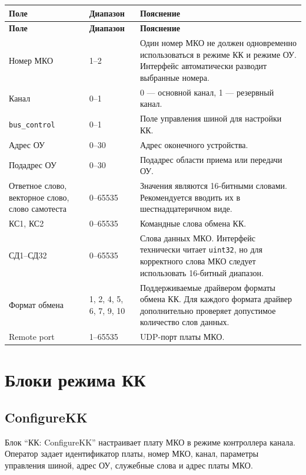 \begin{longtable}{|p{}|p{}|p{}|}
	\hline
	\textbf{Поле} & \textbf{Диапазон} & \textbf{Пояснение} \\
	\hline
	\endfirsthead
	\hline
	\textbf{Поле} & \textbf{Диапазон} & \textbf{Пояснение} \\
	\hline
	\endhead
	Номер МКО & 1--2 & Один номер МКО не должен одновременно использоваться в режиме КК и режиме ОУ. Интерфейс автоматически разводит выбранные номера. \\
	\hline
	Канал & 0--1 & 0 --- основной канал, 1 --- резервный канал. \\
	\hline
	\texttt{bus\_control} & 0--1 & Поле управления шиной для настройки КК. \\
	\hline
	Адрес ОУ & 0--30 & Адрес оконечного устройства. \\
	\hline
	Подадрес ОУ & 0--30 & Подадрес области приема или передачи ОУ. \\
	\hline
	Ответное слово, векторное слово, слово самотеста & 0--65535 & Значения являются 16-битными словами. Рекомендуется вводить их в шестнадцатеричном виде. \\
	\hline
	КС1, КС2 & 0--65535 & Командные слова обмена КК. \\
	\hline
	СД1--СД32 & 0--65535 & Слова данных МКО. Интерфейс технически читает \texttt{uint32}, но для корректного слова МКО следует использовать 16-битный диапазон. \\
	\hline
	Формат обмена & 1, 2, 4, 5, 6, 7, 9, 10 & Поддерживаемые драйвером форматы обмена КК. Для каждого формата драйвер дополнительно проверяет допустимое количество слов данных. \\
	\hline
	Remote port & 1--65535 & UDP-порт платы МКО. \\
	\hline
\end{longtable}

\section{Блоки режима КК}

\subsection{ConfigureKK}

Блок ``КК: ConfigureKK'' настраивает плату МКО в режиме контроллера канала. Оператор задает идентификатор платы, номер МКО, канал, параметры управления шиной, адрес ОУ, служебные слова и адрес платы МКО.

